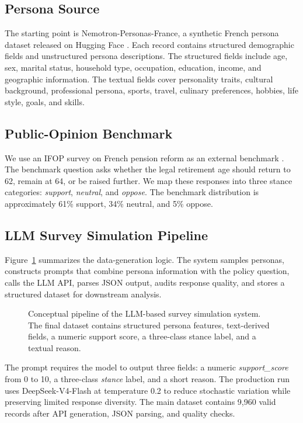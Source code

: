 ﻿\documentclass[10pt,twocolumn]{article}
\newcommand{\dataset}{Nemotron-Personas-France}
\newcommand{\ifop}{IFOP}
\newcommand{\stance}{\textit{stance}}
\newcommand{\score}{\textit{support\_score}}
\begin{document}
\subsection{Persona Source}
The starting point is \dataset{}, a synthetic French persona dataset released on Hugging Face \cite{nvidia2024nemotron}. Each record contains structured demographic fields and unstructured persona descriptions. The structured fields include age, sex, marital status, household type, occupation, education, income, and geographic information. The textual fields cover personality traits, cultural background, professional persona, sports, travel, culinary preferences, hobbies, life style, goals, and skills.

\subsection{Public-Opinion Benchmark}
We use an \ifop{} survey on French pension reform as an external benchmark \cite{ifop2023pension}. The benchmark question asks whether the legal retirement age should return to 62, remain at 64, or be raised further. We map these responses into three stance categories: \textit{support}, \textit{neutral}, and \textit{oppose}. The benchmark distribution is approximately 61\% support, 34\% neutral, and 5\% oppose.

\subsection{LLM Survey Simulation Pipeline}
Figure~\ref{fig:pipeline} summarizes the data-generation logic. The system samples personas, constructs prompts that combine persona information with the policy question, calls the LLM API, parses JSON output, audits response quality, and stores a structured dataset for downstream analysis.

\begin{figure}[t]
  \centering
  \caption{Conceptual pipeline of the LLM-based survey simulation system. The final dataset contains structured persona features, text-derived fields, a numeric support score, a three-class stance label, and a textual reason.}
  \label{fig:pipeline}
\end{figure}

The prompt requires the model to output three fields: a numeric \score{} from 0 to 10, a three-class \stance{} label, and a short reason. The production run uses DeepSeek-V4-Flash at temperature 0.2 to reduce stochastic variation while preserving limited response diversity. The main dataset contains 9,960 valid records after API generation, JSON parsing, and quality checks.
\end{document}

